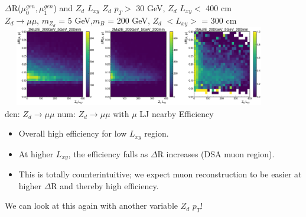\documentclass{beamer}
\begin{document}
\begin{frame}[t]{$\Delta$R($\mu^{gen}_0, \mu^{gen}_1$) and $Z_d$ $L_{xy}$ }
\centering
$Z_d$ $p_T>$ 30 GeV, $Z_d$ $L_{xy}<$ 400 cm\\
\scriptsize
\textcolor{UniBlue}{$Z_d \rightarrow \mu\mu$}, \textcolor{uvaorange}{$m_{Z_d}$ = 5 GeV,$m_B$ = 200 GeV, $Z_d$ $<L_{xy}>$ = 300 cm}\\
\includegraphics[width =12cm, height =3.5cm]{zd_mumu_lxy_dR_5.png}\\
{\tiny \textcolor{uvaorange}{\hspace{-1cm}den: $Z_d\rightarrow\mu\mu$ \hspace{2.5cm } num: $Z_d\rightarrow\mu\mu$ with  $\mu$ LJ nearby\hspace{2cm} Efficiency\\}}

\normalsize
\begin{itemize}
    \item Overall high efficiency for low $L_{xy}$ region.
     \vspace{1pt}
    \item At higher $L_{xy}$, the efficiency falls as $\Delta$R increases (DSA muon region).
     \vspace{1pt}
    \item This is totally counterintuitive; we expect muon reconstruction to be easier at higher $\Delta$R and thereby high efficiency. 

\end{itemize}
 We can look at this again with another variable $Z_d$ $p_T$!
\end{frame}
\end{document}
